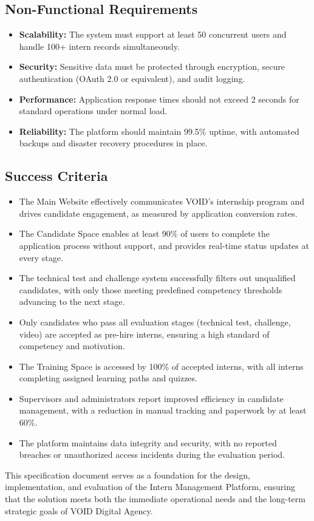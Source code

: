 \subsection{Non-Functional Requirements}
\begin{itemize}
    \item \textbf{Scalability:} The system must support at least 50 concurrent users and handle 100+ intern records simultaneously.
    \item \textbf{Security:} Sensitive data must be protected through encryption, secure authentication (OAuth 2.0 or equivalent), and audit logging.
    \item \textbf{Performance:} Application response times should not exceed 2 seconds for standard operations under normal load.
    \item \textbf{Reliability:} The platform should maintain 99.5\% uptime, with automated backups and disaster recovery procedures in place.
\end{itemize}

\subsection{Success Criteria}
\begin{itemize}
    \item The Main Website effectively communicates VOID's internship program and drives candidate engagement, as measured by application conversion rates.
    \item The Candidate Space enables at least 90\% of users to complete the application process without support, and provides real-time status updates at every stage.
    \item The technical test and challenge system successfully filters out unqualified candidates, with only those meeting predefined competency thresholds advancing to the next stage.
    \item Only candidates who pass all evaluation stages (technical test, challenge, video) are accepted as pre-hire interns, ensuring a high standard of competency and motivation.
    \item The Training Space is accessed by 100\% of accepted interns, with all interns completing assigned learning paths and quizzes.
    \item Supervisors and administrators report improved efficiency in candidate management, with a reduction in manual tracking and paperwork by at least 60\%.
    \item The platform maintains data integrity and security, with no reported breaches or unauthorized access incidents during the evaluation period.
\end{itemize}

\noindent
This specification document serves as a foundation for the design, implementation, and evaluation of the Intern Management Platform, ensuring that the solution meets both the immediate operational needs and the long-term strategic goals of VOID Digital Agency.
